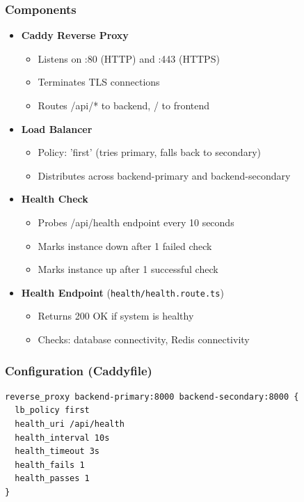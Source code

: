 \documentclass[12pt,oneside,a4paper]{article}
\begin{document}
\subsubsection{Components}
\begin{itemize}
    \item \textbf{Caddy Reverse Proxy}
        \begin{itemize}
            \item Listens on :80 (HTTP) and :443 (HTTPS)
            \item Terminates TLS connections
            \item Routes /api/* to backend, / to frontend
        \end{itemize}
    \item \textbf{Load Balancer}
        \begin{itemize}
            \item Policy: 'first' (tries primary, falls back to secondary)
            \item Distributes across backend-primary and backend-secondary
        \end{itemize}
    \item \textbf{Health Check}
        \begin{itemize}
            \item Probes /api/health endpoint every 10 seconds
            \item Marks instance down after 1 failed check
            \item Marks instance up after 1 successful check
        \end{itemize}
    \item \textbf{Health Endpoint} (\texttt{health/health.route.ts})
        \begin{itemize}
            \item Returns 200 OK if system is healthy
            \item Checks: database connectivity, Redis connectivity
        \end{itemize}
\end{itemize}

\subsubsection{Configuration (Caddyfile)}
\begin{lstlisting}
reverse_proxy backend-primary:8000 backend-secondary:8000 {
  lb_policy first
  health_uri /api/health
  health_interval 10s
  health_timeout 3s
  health_fails 1
  health_passes 1
}
\end{lstlisting}
\end{document}
